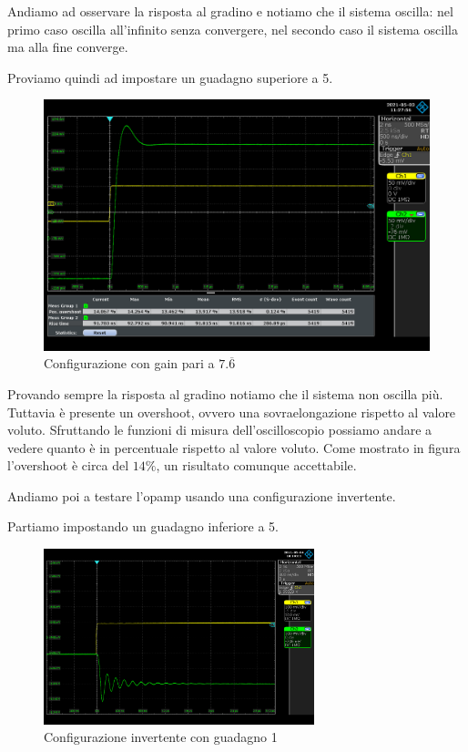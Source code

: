 Andiamo ad osservare la risposta al gradino e notiamo che il sistema oscilla: nel primo caso oscilla all'infinito senza convergere, nel secondo caso il sistema oscilla ma alla fine converge.

Proviamo quindi ad impostare un guadagno superiore a 5.

\begin{figure}[H]
\centering
\includegraphics[width=\textwidth]{assets/exp8/Guadagno_7.6666_pt2.png}
\caption{Configurazione con gain pari a $7.\overline{6}$}
\end{figure}

Provando sempre la risposta al gradino notiamo che il sistema non oscilla più. Tuttavia è presente un overshoot, ovvero una sovraelongazione rispetto al valore voluto.
Sfruttando le funzioni di misura dell'oscilloscopio possiamo andare a vedere quanto è in percentuale rispetto al valore voluto.
Come mostrato in figura l'overshoot è circa del $14\%$, un risultato comunque accettabile.

\vspace*{0.5cm}

\noindent
Andiamo poi a testare l'opamp usando una configurazione invertente.

Partiamo impostando un guadagno inferiore a 5.
\begin{figure}[H]
\centering
\includegraphics[width=0.7\textwidth]{assets/exp8/invertente_guadagno_1.png}
\caption{Configurazione invertente con guadagno 1}
\end{figure}

